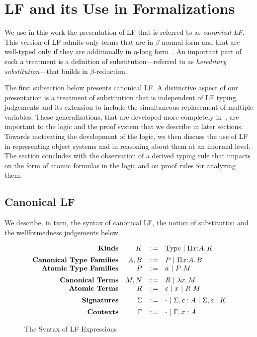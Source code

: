 \section{LF and its Use in Formalizations}
\label{sec:lf}

We use in this work the presentation of LF that is referred to as
\emph{canonical LF}.
%
This version of LF admits only terms that are in $\beta$-normal form
and that are well-typed only if they are additionally in $\eta$-long
form~\cite{harper07jfp,watkins03tr}.
%
An important part of such a treatment is a definition of
substitution---referred to as \emph{hereditary substitution}---that
builds in $\beta$-reduction.

The first subsection below presents canonical LF.
%
A distinctive aspect of our presentation is a treatment of
substitution that is independent of LF typing judgements and its
extension to include the simultaneous replacement of multiple
variables.
%
These generalizations, that are developed more completely
in~\cite{nadathur21arxiv}, are important to the logic and the proof
system that we describe in later sections. 
%
Towards motivating the development of the logic, 
we then discuss the use of LF in representing
object systems and in reasoning about them at an informal level.
%
The section concludes with the observation of a derived typing rule
that impacts on the form of atomic formulas in the logic and on proof
rules for analyzing them.  

\subsection{Canonical LF}\label{ssec:lf-syntax}

We describe, in turn, the syntax of canonical LF, the notion of
substitution and the wellformedness judgements below. 

\begin{figure}[htpb]
\[
\begin{array}{r r c l}
  \mbox{\bf Kinds} & K & ::= & \type\ |\ \typedpi{x}{A}{K}\\[5pt]

  \mbox{\bf Canonical Type Families} & A,B & ::= &
           P\ |\ \typedpi{x}{A}{B}\\
  \mbox{\bf Atomic Type Families} & P & ::= & a\ |\ P\app M\\[5pt]
  \mbox{\bf Canonical Terms} & M,N & ::= & R\ |\ \lflam{x}{M}\\
  \mbox{\bf Atomic Terms} & R & ::= & c\ |\ x\ |\ R\app M\\[5pt]
  \mbox{\bf Signatures} & \Sigma & ::= &
  \emptysig\ |\ \Sigma,c:A\ |\ \Sigma,a:K\\[5pt]
  \mbox{\bf Contexts} & \Gamma & ::= & \emptyctx\ |\ \Gamma,x:A
\end{array}
\]
\caption{The Syntax of LF Expressions}
\label{fig:lf-terms}
\end{figure}

